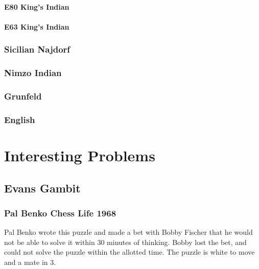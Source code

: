 \documentclass[]{book}
\begin{document}
\hypertarget{e80-kings-indian}{%
\subsubsection{E80 King's Indian}\label{e80-kings-indian}}

\hypertarget{e63-kings-indian}{%
\subsubsection{E63 King's Indian}\label{e63-kings-indian}}

\hypertarget{sicilian-najdorf}{%
\subsection{Sicilian Najdorf}\label{sicilian-najdorf}}

\hypertarget{nimzo-indian}{%
\subsection{Nimzo Indian}\label{nimzo-indian}}

\hypertarget{grunfeld}{%
\subsection{Grunfeld}\label{grunfeld}}

\hypertarget{english}{%
\subsection{English}\label{english}}

\hypertarget{interesting_problems}{%
\chapter{Interesting Problems}\label{interesting_problems}}

\hypertarget{evans-gambit-1}{%
\section{Evans Gambit}\label{evans-gambit-1}}

\hypertarget{pal-benko-chess-life-1968}{%
\subsection{Pal Benko Chess Life 1968}\label{pal-benko-chess-life-1968}}

Pal Benko wrote this puzzle and made a bet with Bobby Fischer that he would not be able to solve it within 30 minutes of thinking. Bobby lost the bet, and could not solve the puzzle within the allotted time. The puzzle is white to move and a mate in 3.


\end{document}
